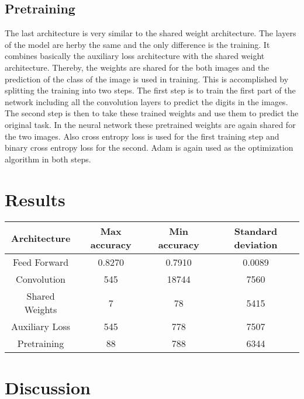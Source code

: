 \documentclass[12pt]{article}
\begin{document}
\subsection{Pretraining}
The last architecture is very similar to the shared weight architecture.
The layers of the model are herby the same and the only difference is the training.
It combines basically the auxiliary loss architecture with the shared weight architecture.
Thereby, the weights are shared for the both images and the prediction of the class of the image is used in training.
This is accomplished by splitting the training into two steps.
The first step is to train the first part of the network including all the convolution layers to predict the digits in the images.
The second step is then to take these trained weights and use them to predict the original task.
In the neural network these pretrained weights are again shared for the two images.
Also cross entropy loss is used for the first training step and binary cross entropy loss for the second.
Adam is again used as the optimization algorithm in both steps. 
\section{Results}
\begin{center}
\begin{tabular}{| c | c | c | c |} 
 \hline
 Architecture & Max accuracy & Min accuracy & Standard deviation \\ [0.5ex] 
 \hline\hline
  Feed Forward & 0.8270 & 0.7910 & 0.0089  \\ 
 \hline
 Convolution & 545 & 18744 & 7560 \\
 \hline
 Shared Weights & 7 & 78 & 5415 \\
 \hline
 Auxiliary Loss & 545 & 778 & 7507 \\
 \hline
 
 Pretraining & 88 & 788 & 6344 \\ [1ex] 
 \hline
\end{tabular}
\end{center}
\section{Discussion}
\end{document}
